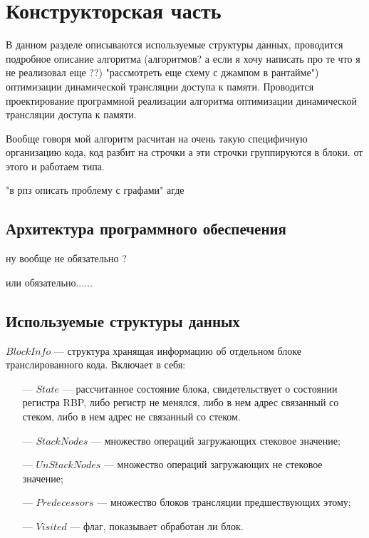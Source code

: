 \section{Конструкторская часть}

В данном разделе описываются используемые структуры данных, проводится
подробное описание алгоритма (алгоритмов? а если я хочу написать про те что я не реализовал еще ??) "рассмотреть еще схему с джампом в рантайме") оптимизации динамической трансляции доступа к памяти. Проводится проектирование программной реализации алгоритма оптимизации динамической трансляции доступа к памяти.

Вообще говоря мой алгоритм расчитан на очень такую специфичную организацию кода, код разбит на строчки а эти строчки группируются в блоки. от этого и работаем типа.

"в рпз описать проблему с графами" агде

\subsection{Архитектура программного обеспечения}

ну вообще не обязательно ?

или обязательно...... 

\subsection{Используемые структуры данных}

$BlockInfo$ --- структура хранящая информацию об отдельном блоке транслированного кода. Включает в себя:

\begin{itemize}[leftmargin=1.6\parindent]
	\item[---] $State$ --- рассчитанное состояние блока, свидетельствует о состоянии регистра RBP, либо регистр не менялся, либо в нем адрес связанный со стеком, либо в нем адрес не связанный со стеком.
	\item[---] $StackNodes$ --- множество операций загружающих стековое значение;
	\item[---] $UnStackNodes$ --- множество операций загружающих не стековое значение;
	\item[---] $Predecessors$ --- множество блоков трансляции предшествующих этому;
	\item[---] $Visited$ --- флаг, показывает обработан ли блок.
\end{itemize}


